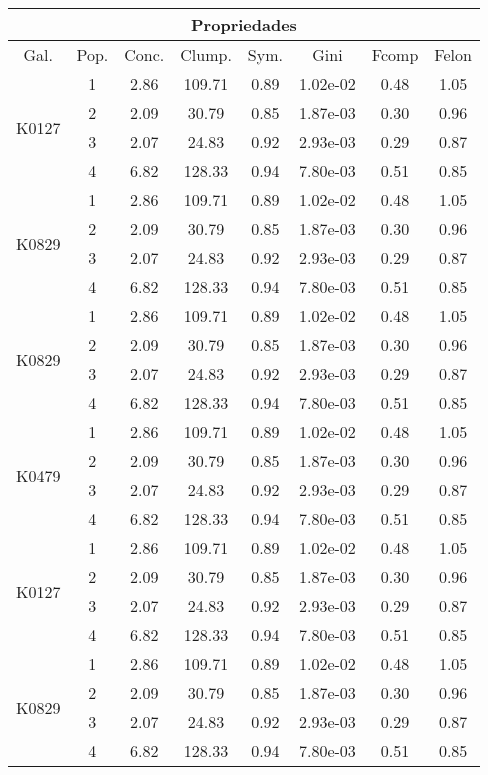 \documentclass[11pt,a4paper]{article}
\begin{document}
\begin{longtable}{|c|c|c|c|c|c|c|c|}
\hline
\multicolumn{8}{|c|}{Propriedades} \\
\hline
Gal. & Pop. & Conc. & Clump. & Sym. & Gini & Fcomp & Felon\\ \hline

\multirow{4}{*}{K0127} & 1 & 2.86 & 109.71 & 0.89 & 1.02e-02 & 0.48 & 1.05 \\
& 2 & 2.09 & 30.79 & 0.85 & 1.87e-03 & 0.30 & 0.96 \\
& 3 & 2.07 & 24.83 & 0.92 & 2.93e-03 & 0.29 & 0.87 \\
& 4 & 6.82 & 128.33 & 0.94 & 7.80e-03 & 0.51 & 0.85 \\ \hline

\multirow{4}{*}{K0829} & 1 & 2.86 & 109.71 & 0.89 & 1.02e-02 & 0.48 & 1.05 \\
& 2 & 2.09 & 30.79 & 0.85 & 1.87e-03 & 0.30 & 0.96 \\
& 3 & 2.07 & 24.83 & 0.92 & 2.93e-03 & 0.29 & 0.87 \\
& 4 & 6.82 & 128.33 & 0.94 & 7.80e-03 & 0.51 & 0.85 \\ \hline

\multirow{4}{*}{K0829} & 1 & 2.86 & 109.71 & 0.89 & 1.02e-02 & 0.48 & 1.05 \\
& 2 & 2.09 & 30.79 & 0.85 & 1.87e-03 & 0.30 & 0.96 \\
& 3 & 2.07 & 24.83 & 0.92 & 2.93e-03 & 0.29 & 0.87 \\
& 4 & 6.82 & 128.33 & 0.94& 7.80e-03 & 0.51 & 0.85 \\ \hline

\multirow{4}{*}{K0479} & 1 & 2.86 & 109.71 & 0.89 & 1.02e-02 & 0.48 & 1.05 \\
& 2 & 2.09 & 30.79 & 0.85 & 1.87e-03 & 0.30 & 0.96 \\
& 3 & 2.07 & 24.83 & 0.92 & 2.93e-03 & 0.29 & 0.87 \\
& 4 & 6.82 & 128.33 & 0.94& 7.80e-03 & 0.51 & 0.85 \\ \hline


\multirow{4}{*}{K0127} & 1 & 2.86 & 109.71 & 0.89 & 1.02e-02 & 0.48 & 1.05 \\
& 2 & 2.09 & 30.79 & 0.85 & 1.87e-03 & 0.30 & 0.96 \\
& 3 & 2.07 & 24.83 & 0.92 & 2.93e-03 & 0.29 & 0.87 \\
& 4 & 6.82 & 128.33 & 0.94 & 7.80e-03 & 0.51 & 0.85 \\ \hline

\multirow{4}{*}{K0829} & 1 & 2.86 & 109.71 & 0.89 & 1.02e-02 & 0.48 & 1.05 \\
& 2 & 2.09 & 30.79 & 0.85 & 1.87e-03 & 0.30 & 0.96 \\
& 3 & 2.07 & 24.83 & 0.92 & 2.93e-03 & 0.29 & 0.87 \\
& 4 & 6.82 & 128.33 & 0.94 & 7.80e-03 & 0.51 & 0.85 \\ \hline


\end{longtable}
\end{document}

